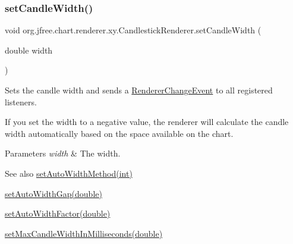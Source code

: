 \subsubsection{\texorpdfstring{set\+Candle\+Width()}{setCandleWidth()}}
{\footnotesize\ttfamily void org.\+jfree.\+chart.\+renderer.\+xy.\+Candlestick\+Renderer.\+set\+Candle\+Width (\begin{DoxyParamCaption}\item[{double}]{width }\end{DoxyParamCaption})}

Sets the candle width and sends a \mbox{\hyperlink{}{Renderer\+Change\+Event}} to all registered listeners. 

If you set the width to a negative value, the renderer will calculate the candle width automatically based on the space available on the chart.


\begin{DoxyParams}{Parameters}
{\em width} & The width. \\
\hline
\end{DoxyParams}
\begin{DoxySeeAlso}{See also}
\mbox{\hyperlink{classorg_1_1jfree_1_1chart_1_1renderer_1_1xy_1_1_candlestick_renderer_a556f4cc791dcf82be3e4e82c6f82dd66}{set\+Auto\+Width\+Method(int)}} 

\mbox{\hyperlink{classorg_1_1jfree_1_1chart_1_1renderer_1_1xy_1_1_candlestick_renderer_ae86e0bc0453129bf8579ae7a5d2ee821}{set\+Auto\+Width\+Gap(double)}} 

\mbox{\hyperlink{classorg_1_1jfree_1_1chart_1_1renderer_1_1xy_1_1_candlestick_renderer_a0189cacb382b9e002ad932e555a79664}{set\+Auto\+Width\+Factor(double)}} 

\mbox{\hyperlink{classorg_1_1jfree_1_1chart_1_1renderer_1_1xy_1_1_candlestick_renderer_a7f28bced2a25bf012d05127ac175af49}{set\+Max\+Candle\+Width\+In\+Milliseconds(double)}} 
\end{DoxySeeAlso}
\mbox{\label{classorg_1_1jfree_1_1chart_1_1renderer_1_1xy_1_1_candlestick_renderer_a4f4d646b118cd0fd8cb206e0d405add5}} 
